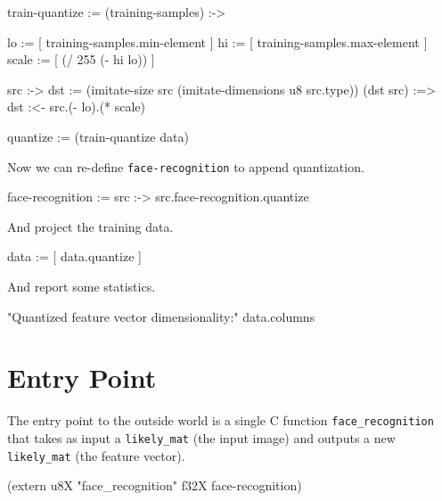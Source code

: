\documentclass{article}
\begin{document}
\begin{likely}
train-quantize :=
  (training-samples) :->
  {
    lo    := [ training-samples.min-element  ]
    hi    := [ training-samples.max-element  ]
    scale := [ (/ 255 (- hi lo)) ]

    src :->
    {
      dst := (imitate-size src (imitate-dimensions u8 src.type))
      (dst src) :=>
        dst :<- src.(- lo).(* scale)
    }
  }

quantize := (train-quantize data)
\end{likely}

Now we can re-define \texttt{face-recognition} to append quantization.

\begin{likely}
face-recognition :=
  src :->
    src.face-recognition.quantize
\end{likely}

And project the training data.

\begin{likely}
data := [ data.quantize ]
\end{likely}

And report some statistics.

\begin{likely}
"Quantized feature vector dimensionality:"
data.columns
\end{likely}

\section{Entry Point}
The entry point to the outside world is a single C function \texttt{face\_recognition} that takes as input a \texttt{likely\_mat} (the input image) and outputs a new \texttt{likely\_mat} (the feature vector).

\begin{likely}
(extern u8X "face_recognition" f32X face-recognition)
\end{likely}
\end{document}
